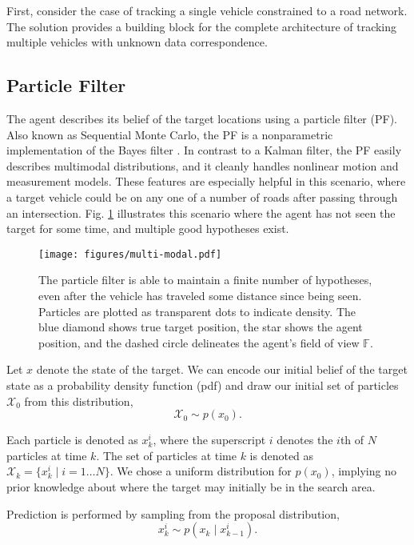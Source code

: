\documentclass[letterpaper, 10 pt, conference]{ieeeconf}  %
\begin{document}
First, consider the case of tracking a single vehicle constrained to a road network. The solution provides a building block for the complete architecture of tracking multiple vehicles with unknown data correspondence.

\subsection{Particle Filter}

The agent describes its belief of the target locations using a particle filter (PF). Also known as Sequential Monte Carlo, the PF is a nonparametric implementation of the Bayes filter \cite{Arulampalam2002}. In contrast to a Kalman filter, the PF easily describes multimodal distributions, and it cleanly handles nonlinear motion and measurement models. These features are especially helpful in this scenario, where a target vehicle could be on any one of a number of roads after passing through an intersection. Fig. \ref{fig:multi-modal} illustrates this scenario where the agent has not seen the target for some time, and multiple good hypotheses exist.

\begin{figure}
\centering
\texttt{[image: figures/multi-modal.pdf]}
\caption{The particle filter is able to maintain a finite number of hypotheses, even after the vehicle has traveled some distance since being seen. Particles are plotted as transparent dots to indicate density. The blue diamond shows true target position, the star shows the agent position, and the dashed circle delineates the agent's field of view $\mathbb{F}$.}
\label{fig:multi-modal}
\end{figure}

Let $x$ denote the state of the target. We can encode our initial belief of the target state as a probability density function (pdf) and draw our initial set of particles $\mathcal{X}_0$ from this distribution,
\begin{equation}%
    \mathcal{X}_0 \sim p(x_0).
\end{equation}

Each particle is denoted as $x^i_k$, where the superscript $i$ denotes the $i$th of $N$ particles at time $k$. The set of particles at time $k$ is denoted as $\mathcal{X}_k = \{x^i_k \mid i = 1 \ldots N\}$. We chose a uniform distribution for $p(x_0)$, implying no prior knowledge about where the target may initially be in the search area.

Prediction is performed by sampling from the proposal distribution,
\begin{equation}\label{eq:proposal_dist}
    x^i_k \sim p(x_k \mid x^i_{k-1}).
\end{equation}
\end{document}
